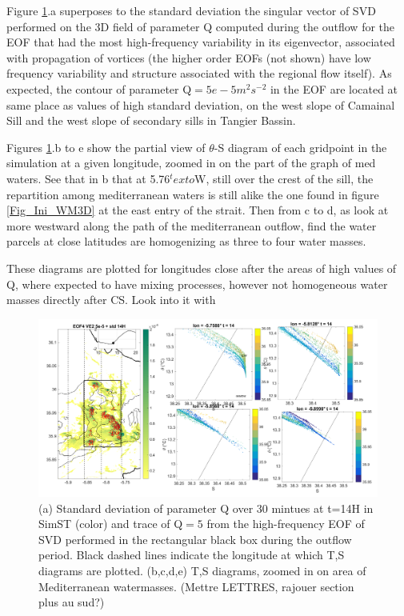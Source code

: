 Figure \ref{FigTSCS}.a superposes to the standard deviation the singular vector of SVD performed on the 3D field of parameter Q computed during the outflow for the EOF that had the most high-frequency variability in its eigenvector, associated with propagation of vortices (the higher order EOFs (not shown) have low frequency variability and structure associated with the regional flow itself). As expected, the contour of parameter Q$=5e-5m^2s^{-2}$ in the EOF are located at same place as values of high standard deviation, on the west slope of Camainal Sill and the west slope of secondary sills in Tangier Bassin. 

Figures \ref{FigTSCS}.b to e show the partial view of $\theta$-S diagram of each gridpoint in the simulation at a given longitude, zoomed in on the part of the graph of med waters. See that in b that at 5.76$^text{o}$W, still over the crest of the sill, the repartition among mediterranean waters is still alike the one found in figure \ref{Fig_Ini_WM3D} at the east entry of the strait. Then from c to d, as look at more westward along the path of the mediterranean outflow, find the water parcels at close latitudes are homogenizing as three to four water masses.

These diagrams are plotted for longitudes close after the areas of high values of Q, where expected to have mixing processes, however not homogeneous water masses directly after CS. Look into it with 

\begin{figure}[!h]
 \includegraphics[width=\textwidth]{./GBR3D/TS_coupes_14H_VE2o.png}
 \caption {(a) Standard deviation of parameter Q over 30 mintues at t=14H in SimST (color) and trace of Q$=5$ from the high-frequency EOF of SVD performed in the rectangular black box during the outflow period. Black dashed lines indicate the longitude at which T,S diagrams are plotted. (b,c,d,e) T,S diagrams, zoomed in on area of Mediterranean watermasses. (Mettre LETTRES, rajouer section plus au sud?)}
 \label{FigTSCS}
\end{figure}


